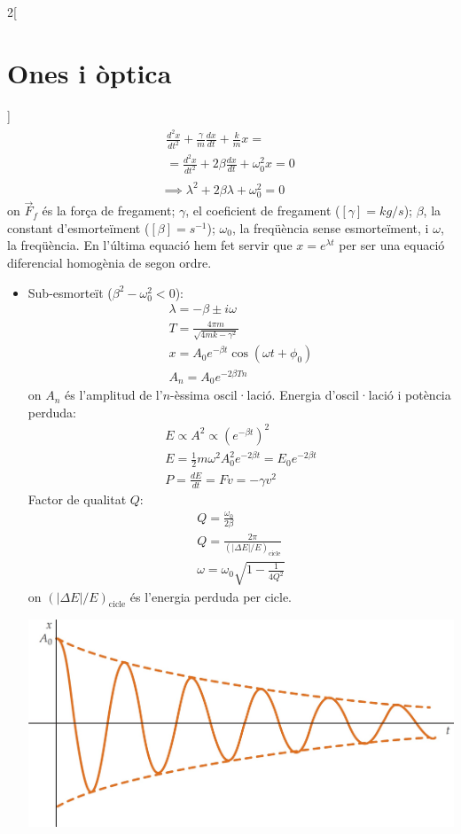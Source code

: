 \documentclass[../../../main.tex]{subfiles}
\begin{document}
\begin{multicols}{2}[\section{Ones i òptica}]
\begin{gather*}
    \begin{multlined}
      \frac{d^2x}{dt^2}+\frac{\gamma}{m}\frac{dx}{dt}+\frac{k}{m}x=\\=\frac{d^2x}{dt^2}+2\beta\frac{dx}{dt}+\omega_0^2x=0
    \end{multlined}\\
    \implies\lambda^2+2\beta\lambda+\omega_0^2=0
  \end{gather*}
  {\footnotesize on $\Vec{F}_f$ és la força de fregament; $\gamma$, el coeficient de fregament ($[\gamma]=kg/s$); $\beta$, la constant d'esmorteïment ($[\beta]=s^{-1}$); $\omega_0$, la freqüència sense esmorteïment, i $\omega$, la freqüència. En l'última equació hem fet servir que $x=e^{\lambda t}$ per ser una equació diferencial homogènia de segon ordre.}
  \begin{itemize}
    \item Sub-esmorteït ($\beta^2-\omega_0^2<0$):
          \begin{gather*}
            \lambda=-\beta\pm i\omega\\
            T=\frac{4\pi m}{\sqrt{4mk-\gamma^2}}\\
            x=A_0e^{-\beta t}\cos(\omega t+\phi_0)\\
            A_n=A_0e^{-2\beta Tn}
          \end{gather*} {\footnotesize on $A_n$ és l'amplitud de l'$n$-èssima oscil·lació.}\newline
          Energia d'oscil·lació i potència perduda:
          \begin{gather*}
            E\propto A^2\propto (e^{-\beta t})^2\\
            E=\frac{1}{2}m\omega^2A_0^2e^{-2\beta t}=E_0e^{-2\beta t}\\
            P=\frac{dE}{dt}=Fv=-\gamma v^2
          \end{gather*}
          Factor de qualitat $Q$:
          \begin{gather*}
            Q=\frac{\omega_0}{2\beta}\\
            Q=\frac{2\pi}{(|\Delta E|/E)_{\text{cicle}}}\\
            \omega=\omega_0\sqrt{1-\frac{1}{4Q^2}}
          \end{gather*} {\footnotesize on $(|\Delta E|/E)_{\text{cicle}}$ és l'energia perduda per cicle.}\newline
          \begin{minipage}{\linewidth}
            \centering
            \includegraphics[width=\linewidth]{Physics/1st/Waves_and_optics/Images/udamp.jpg}

\end{minipage}
\end{itemize}
\end{multicols}
\end{document}
